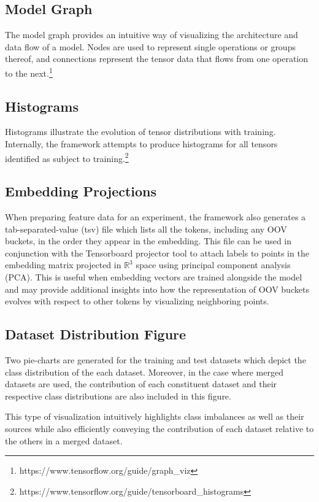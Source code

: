 \documentclass[../../fyp.tex]{subfiles}
\begin{document}
\subsection{Model Graph}
The model graph provides an intuitive way of visualizing the architecture and data flow of a model. Nodes are used to represent single operations or groups thereof, and connections represent the tensor data that flows from one operation to the next.\footnote{https://www.tensorflow.org/guide/graph\_viz} 

\subsection{Histograms}
Histograms illustrate the evolution of tensor distributions with training. Internally, the framework attempts to produce histograms for all tensors identified as subject to training.\footnote{https://www.tensorflow.org/guide/tensorboard\_histograms}

\subsection{Embedding Projections}
When preparing feature data for an experiment, the framework also generates a tab-separated-value (tsv) file which lists all the tokens, including any OOV buckets, in the order they appear in the embedding. This file can be used in conjunction with the Tensorboard projector tool to attach labels to points in  the embedding matrix projected in $\mathbb{R}^3$ space using principal component analysis (PCA). This is useful when embedding vectors are trained alongside the model and may provide additional insights into how the representation of OOV buckets evolves with respect to other tokens by visualizing neighboring points.

\subsection{Dataset Distribution Figure}
Two pie-charts are generated for the training and test datasets which depict the class distribution of the each dataset. Moreover, in the case where merged datasets are used, the contribution of each constituent dataset and their respective class distributions are also included in this figure. 

This type of visualization intuitively highlights class imbalances as well as their sources while also efficiently conveying the contribution of each dataset relative to the others in a merged dataset.
\end{document}
